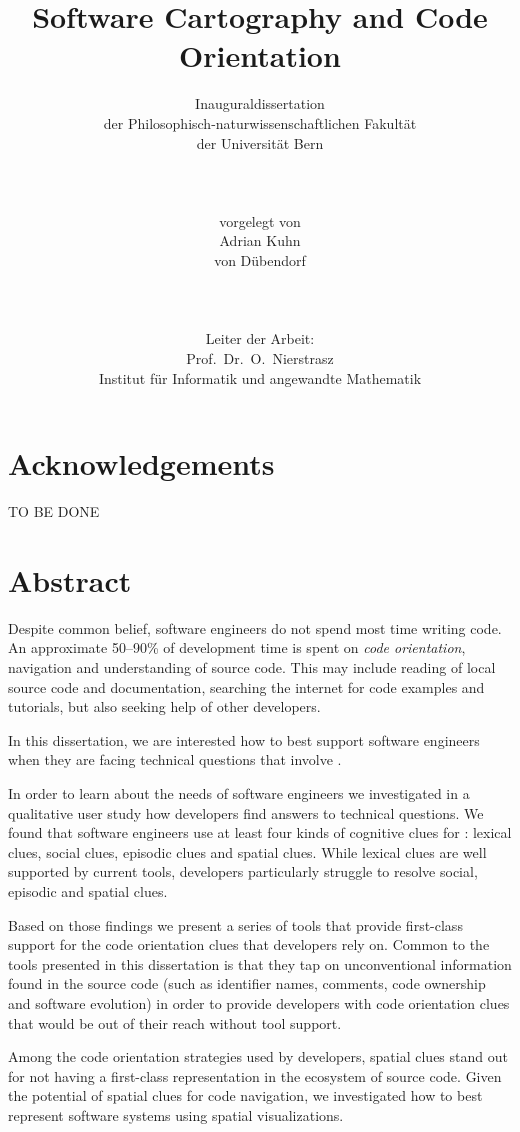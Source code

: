 \documentclass[10pt]{book}
\title{Software Cartography and Code Orientation}
\author{Inauguraldissertation\\
der Philosophisch-naturwissenschaftlichen Fakult\"at\\
der Universit\"at Bern\\
\\
\\
\\
vorgelegt von\\
Adrian Kuhn\\
von D\"ubendorf\\ 
\\
\\
\\
Leiter der Arbeit:\\
Prof.\ Dr.\ O.\ Nierstrasz\\ 
Institut f\"ur Informatik und angewandte Mathematik}
\date{}
\begin{document}
\maketitle

\chapter*{Acknowledgements}
TO BE DONE

\chapter*{Abstract}

Despite common belief, software engineers do not spend most time writing code. An approximate 50--90\% of development time is spent on \emph{code orientation}, \ie navigation and understanding of source code. This may include reading of local source code and documentation, searching the internet for code examples and tutorials, but also seeking help of other developers. 

In this dissertation, we are interested how to best support software engineers when they are facing technical questions that involve \codenavigation. 

In order to learn about the \codenavigation needs of software engineers we investigated in a qualitative user study how developers find answers to technical questions. We found that software engineers use at least four kinds of cognitive clues for \codenavigation: 
	lexical clues, 
	social clues, 
	episodic clues 
	and spatial clues.
While lexical clues are well supported by current tools, developers particularly struggle to resolve social, episodic and spatial clues. 

Based on those findings we present a series of tools that provide first-class support for the code orientation clues that developers rely on. Common to the tools presented in this dissertation is that they tap on unconventional information found in the source code (such as identifier names, comments, code ownership and software evolution) in order to provide developers with code orientation clues that would be out of their reach without tool support.

Among the code orientation strategies used by developers, spatial clues stand out for not having a first-class representation in the ecosystem of source code. Given the potential of spatial clues for code navigation, we investigated how to best represent software systems using spatial visualizations. 
\end{document}
